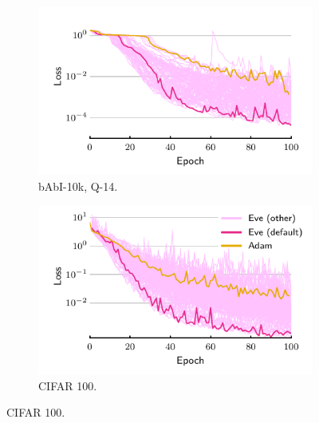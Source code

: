 \documentclass[preview,varwidth=7in,border=0mm]{standalone}
\begin{document}
\begin{figure}
    \centering
    \hfill%
    \begin{subfigure}[t]{0.5\textwidth}
        \centering
        \includegraphics[width=\linewidth]{babi_q14.pdf}
        \caption{bAbI-10k, Q-14.}
    \end{subfigure}%
    \begin{subfigure}[t]{0.5\textwidth}
        \centering
        \includegraphics[width=\linewidth]{resnet.pdf}
        \caption{CIFAR 100.}
    \end{subfigure}
    \hfill%
\end{figure}
\end{document}
